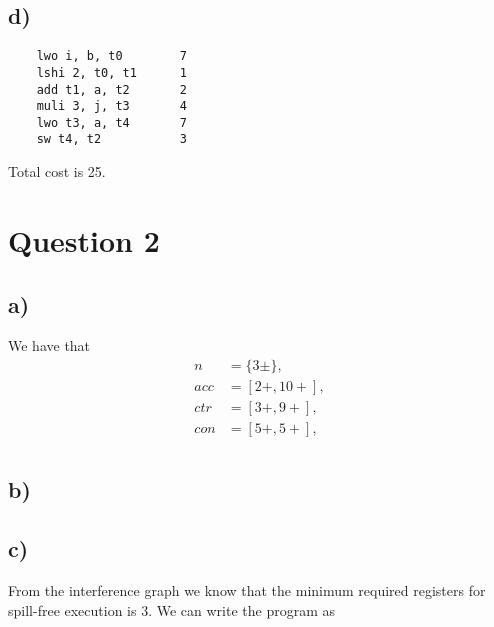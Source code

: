 \documentclass{article}
\begin{document}
\subsection*{d)}
\begin{verbatim}
    lwo i, b, t0        7
    lshi 2, t0, t1      1
    add t1, a, t2       2
    muli 3, j, t3       4
    lwo t3, a, t4       7
    sw t4, t2           3
\end{verbatim}

Total cost is 25.

\section*{Question 2}
\subsection*{a)}

We have that
\begin{align*}
    n   & = \{3\pm \}, \\
    acc & = [2+, 10+], \\
    ctr & = [3+, 9+],  \\
    con & = [5+, 5+],  \\
\end{align*}

\subsection*{b)}

\begin{figure}[h]
    \centering
\end{figure}

\subsection*{c)}
From the interference graph we know that the minimum required registers for spill-free execution is 3.
We can write the program as
\end{document}
